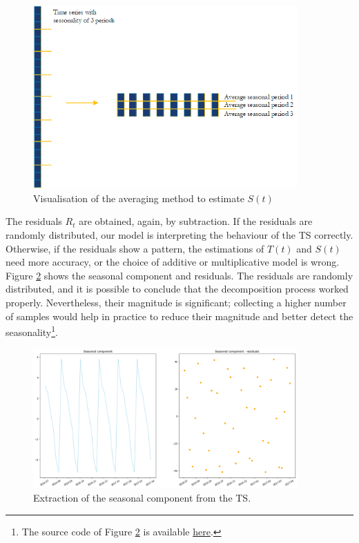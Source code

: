 \begin{figure}[hbt!]
\centering
\includegraphics[width=0.9\textwidth]{SectionLetsMath/elemStat_figures/fig_averaging.png}
\captionsetup{type=figure}
\caption{Visualisation of the averaging method to estimate $S(t)$}
\label{fig_averaging}
\end{figure}

The residuals $R_t$ are obtained, again, by subtraction. If the residuals are randomly distributed, our model is interpreting the behaviour of the TS correctly. Otherwise, if the residuals show a pattern,  the estimations of $T(t)$ and $S(t)$ need more accuracy, or the choice of additive or multiplicative model is wrong. Figure \ref{fig_extractedSeasonality} shows the seasonal component and residuals. The residuals are randomly distributed, and it is possible to conclude that the decomposition process worked properly. Nevertheless, their magnitude is significant; collecting a higher number of samples would help in practice to reduce their magnitude and better detect the seasonality\footnote{The source code of Figure \ref{fig_extractedSeasonality} is available \href{https://github.com/aletuf93/logproj/blob/master/examples/03.\%20Statistics.ipynb}{here}.}.

\begin{figure}[hbt!]
\centering
\includegraphics[width=0.9\textwidth]{SectionLetsMath/elemStat_figures/fig_extractedSeasonality.png}
\captionsetup{type=figure}
\caption{Extraction of the seasonal component from the TS.}
\label{fig_extractedSeasonality}
\end{figure}

